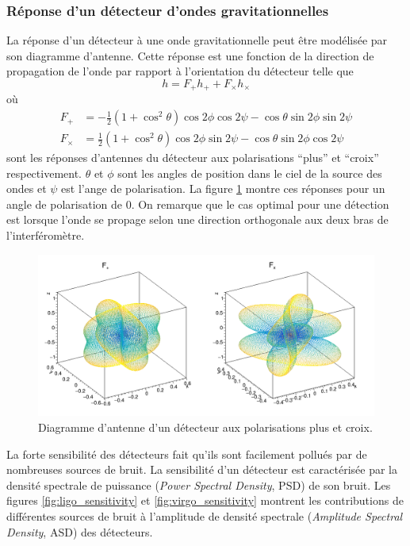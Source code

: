 \subsubsection{Réponse d'un détecteur d'ondes gravitationnelles}

La réponse d'un détecteur à une onde gravitationnelle peut être modélisée par son diagramme d'antenne.
Cette réponse est une fonction de la direction de propagation de l'onde par rapport à l'orientation du détecteur telle que
\begin{equation}
  h = F_+ h_+ + F_\times h_\times
\end{equation}
où \cite{antenna_patterns}
\begin{align}
  F_+ &= -\frac{1}{2}(1+\cos^2\theta) \cos 2\phi \cos 2\psi - \cos \theta \sin 2\phi \sin 2 \psi\\
  F_\times &= \frac{1}{2}(1+\cos^2\theta) \cos 2\phi \sin 2\psi - \cos \theta \sin 2\phi \cos 2 \psi
\end{align}
sont les réponses d'antennes du détecteur aux polarisations ``plus'' et ``croix'' respectivement.
$\theta$ et $\phi$ sont les angles de position dans le ciel de la source des ondes et $\psi$ est l'ange de polarisation.
La figure \ref{fig:antenna_pattern} montre ces réponses pour un angle de polarisation de 0.
On remarque que le cas optimal pour une détection est lorsque l'onde se propage selon une direction orthogonale aux deux bras de l'interféromètre.
%
\begin{figure}
  \centering
  \includegraphics[width=\linewidth]{sectionDetection/antenna.png}
  \caption{Diagramme d'antenne d'un détecteur aux polarisations plus et croix.}
  \label{fig:antenna_pattern}
\end{figure}
%

La forte sensibilité des détecteurs fait qu'ils sont facilement pollués par de nombreuses sources de bruit.
La sensibilité d'un détecteur est caractérisée par la densité spectrale de puissance (\textit{Power Spectral Density}, PSD) de son bruit.
Les figures \ref{fig:ligo_sensitivity} et \ref{fig:virgo_sensitivity} montrent les contributions de différentes sources de bruit à l'amplitude de densité spectrale (\textit{Amplitude Spectral Density}, ASD) des détecteurs.


